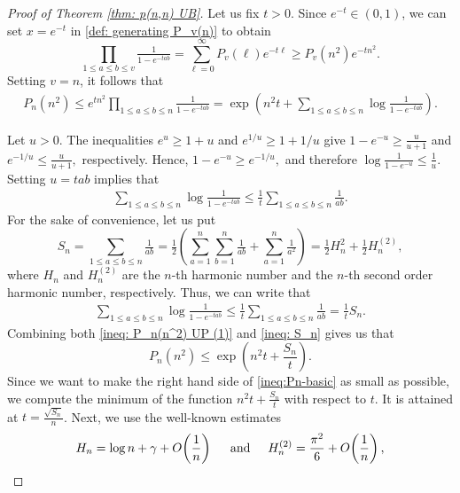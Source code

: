 \documentclass[12pt,a4paper]{amsart}
\numberwithin{equation}{section}
\theoremstyle{plain}
\theoremstyle{definition}
\theoremstyle{remark}
\begin{document}
\begin{proof}[Proof of Theorem \ref{thm: p(n,n) UB}]
Let us fix $t>0$. Since $e^{-t}\in(0,1)$, we can set $x=e^{-t}$ in \eqref{def: generating P_v(n)} to obtain
$$
\prod_{1\le a\le b\le v}\tfrac{1}{1-e^{-tab}}
=
\sum_{\ell=0}^\infty P_v(\ell)e^{-t\ell}
\ge
P_v(n^2)e^{-tn^2}.$$
Setting $v=n$, it follows that
\begin{align}\label{ineq: P_n(n^2) UP (1)}
P_n(n^2)\le
e^{tn^2}
\prod_{1\le a\le b\le n}\frac{1}{1-e^{-tab}}=\exp\left(
n^2t+
\sum_{1\le a\le b\le n}
\log\frac{1}{1-e^{-tab}}
\right).
\end{align}

Let $u>0$. The inequalities $e^u\geq1+u$ and $e^{1/u}\geq1+1/u$ give
$
1-e^{-u}\geq\tfrac{u}{u+1}
$
and
$
e^{-1/u}\le \tfrac{u}{u+1},
$
respectively. Hence,
$
1-e^{-u}\geq e^{-1/u},
$
and therefore
$
\log\tfrac{1}{1-e^{-u}}\le \tfrac1u.
$\\
Setting $u=tab$ implies that
\begin{align*}
    \sum_{1\le a\le b\le n}
\log\frac{1}{1-e^{-tab}}
\le
\frac1t
\sum_{1\le a\le b\le n}\frac1{ab}.
\end{align*}
For the sake of convenience, let us put
$$S_n=\sum_{1\le a\le b\le n}\tfrac1{ab}=\tfrac12\left(
\sum_{a=1}^{n}\sum_{b=1}^{n}\tfrac1{ab}
+
\sum_{a=1}^{n}\tfrac1{a^2}
\right)
=
\tfrac12H_n^2+\tfrac12H_n^{(2)},
$$
where $H_n$ and $H_n^{(2)}$ are the $n$-th harmonic number and the $n$-th second order harmonic number, respectively. Thus, we can write that
\begin{align}\label{ineq: S_n}
    \sum_{1\le a\le b\le n}
\log\frac{1}{1-e^{-tab}}
\le
\frac1t
\sum_{1\le a\le b\le n}\frac1{ab}=\frac{1}{t}S_n.
\end{align}
Combining both \eqref{ineq: P_n(n^2) UP (1)} and \eqref{ineq: S_n} gives us that
\begin{equation}\label{ineq:Pn-basic}
P_n(n^2)\le
\exp\left(
n^2t+\frac{S_n}{t}
\right).
\end{equation}
Since we want to make the right hand side of \eqref{ineq:Pn-basic} as small as possible, we compute the minimum of the function $n^2t+\frac{S_n}{t}$ with respect to $t$. It is attained at $t=\frac{\sqrt{S_n}}{n}$. Next, we use the well-known estimates 
\begin{align*}
H_n=\log n+\gamma+O\!\left(\frac1n\right)\hspace{0.5cm}\text{and}\hspace{0.5cm}H_n^{(2)}=\frac{\pi^2}{6}+O\!\left(\frac1n\right),    
\end{align*}

\end{proof}
\end{document}
